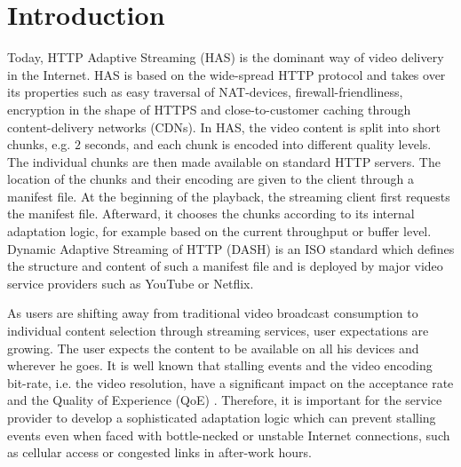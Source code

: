 
\section{Introduction}
\label{sec:introduction}

Today, HTTP Adaptive Streaming (HAS) is the dominant way of video delivery in the Internet. 
HAS is based on the wide-spread HTTP protocol and takes over its properties such as easy traversal of NAT-devices, firewall-friendliness, encryption in the shape of HTTPS and close-to-customer caching through content-delivery networks (CDNs).
In HAS, the video content is split into short chunks, e.g. $2$ seconds, and each chunk is encoded into different quality levels.
The individual chunks are then made available on standard HTTP servers.
The location of the chunks and their encoding are given to the client through a manifest file.
At the beginning of the playback, the streaming client first requests the manifest file. 
Afterward, it chooses the chunks according to its internal adaptation logic, for example based on the current throughput or buffer level.
Dynamic Adaptive Streaming of HTTP (DASH) is an ISO standard which defines the structure and content of such a manifest file and is deployed by major video service providers such as YouTube or Netflix.

As users are shifting away from traditional video broadcast consumption to individual content selection through streaming services, user expectations are growing. 
The user expects the content to be available on all his devices and wherever he goes. 
It is well known that stalling events and the video encoding bit-rate, i.e. the video resolution, have a significant impact on the acceptance rate and the Quality of Experience (QoE) \cite{casas2012youtube}.
Therefore, it is important for the service provider to develop a sophisticated adaptation logic which can prevent stalling events even when faced with bottle-necked or unstable Internet connections, such as cellular access or congested links in after-work hours.

